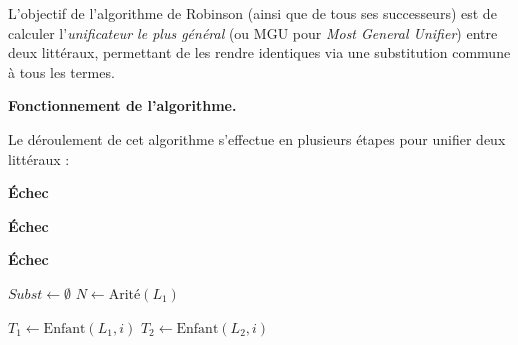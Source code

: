 \documentclass[11pt]{article}
\begin{document}
\vspace{0.2cm}
L'objectif de l'algorithme de Robinson (ainsi que de tous ses successeurs) est de calculer l'\textit{unificateur le plus général} (ou MGU pour \textit{Most General Unifier}) entre deux littéraux, permettant de les rendre identiques via une substitution commune à tous les termes.

\vspace{0.4cm}
\noindent\textbf{Fonctionnement de l'algorithme.}

\vspace{0.2cm}
Le déroulement de cet algorithme s'effectue en plusieurs étapes pour unifier deux littéraux :

\begin{algorithm}[H]
\small
\caption{Unification de deux littéraux (Robinson)}
\label{alg:unification_robinson}
\begin{algorithmic}[1] %
    
        
        \vspace{0.1cm}
        \State {}
            \State \Return \textbf{Échec} 
        \EndIf

        \vspace{0.1cm}
        \State {}
            \State \Return \textbf{Échec} 
        \EndIf
        
        \vspace{0.1cm}
        \State {}
            \State \Return \textbf{Échec} 
        \EndIf
        
        \vspace{0.1cm}
        \State {}
        \State $Subst \gets \emptyset$ 
        \State $N \gets \text{Arité}(L_1)$
        
            \State $T_1 \gets \text{Enfant}(L_1, i)$
            \State $T_2 \gets \text{Enfant}(L_2, i)$
            

\end{algorithmic}
\end{algorithm}
\end{document}
